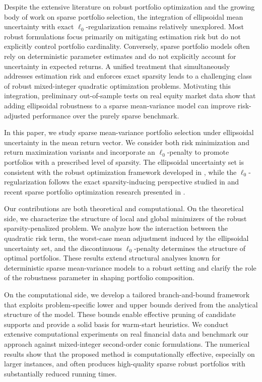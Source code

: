 \documentclass[11pt]{article}
\theoremstyle{plain}
\theoremstyle{definition}
\theoremstyle{plain}
\begin{document}
Despite the extensive literature on robust portfolio optimization and the growing body of work on sparse portfolio selection, the integration of ellipsoidal mean uncertainty with exact $\ell_0$-regularization remains relatively unexplored. Most robust formulations focus primarily on mitigating estimation risk but do not explicitly control portfolio cardinality. Conversely, sparse portfolio models often rely on deterministic parameter estimates and do not explicitly account for uncertainty in expected returns. A unified treatment that simultaneously addresses estimation risk and enforces exact sparsity leads to a challenging class of robust mixed-integer quadratic optimization problems. Motivating this integration, preliminary out-of-sample tests on real equity market data show that adding ellipsoidal robustness to a sparse mean-variance model can improve risk-adjusted performance over the purely sparse benchmark.

In this paper, we study sparse mean-variance portfolio selection under ellipsoidal uncertainty in the mean return vector. We consider both risk minimization and return maximization variants and incorporate an $\ell_0$-penalty to promote portfolios with a prescribed level of sparsity. The ellipsoidal uncertainty set is consistent with the robust optimization framework developed in \cite{Pinar2016,BenTalNemirovski2009,GoldfarbIyengar2003}, while the $\ell_0$-regularization follows the exact sparsity-inducing perspective studied in \cite{Nikolova2013,AkkayaPinar2020,AkkayaPinar2025} and recent sparse portfolio optimization research presented in \cite{SenAkkayaPinar2025}.

Our contributions are both theoretical and computational. On the theoretical side, we characterize the structure of local and global minimizers of the robust sparsity-penalized problem. We analyze how the interaction between the quadratic risk term, the worst-case mean adjustment induced by the ellipsoidal uncertainty set, and the discontinuous $\ell_0$-penalty determines the structure of optimal portfolios. These results extend structural analyses known for deterministic sparse mean-variance models to a robust setting and clarify the role of the robustness parameter in shaping portfolio composition.

On the computational side, we develop a tailored branch-and-bound framework that exploits problem-specific lower and upper bounds derived from the analytical structure of the model. These bounds enable effective pruning of candidate supports and provide a solid basis for warm-start heuristics. We conduct extensive computational experiments on real financial data and benchmark our approach against mixed-integer second-order conic formulations. The numerical results show that the proposed method is computationally effective, especially on larger instances, and often produces high-quality sparse robust portfolios with substantially reduced running times.
\end{document}
